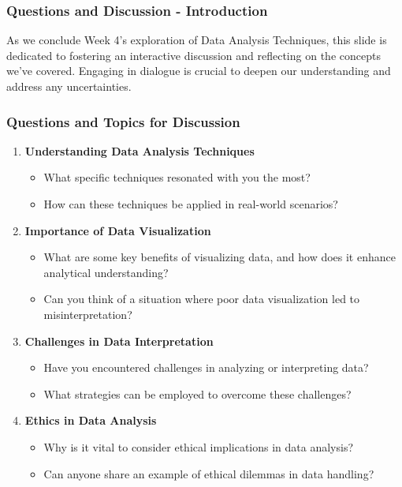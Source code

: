 \documentclass[aspectratio=169]{beamer}
\begin{document}
\begin{frame}[fragile]
  \frametitle{Questions and Discussion - Introduction}
  As we conclude Week 4's exploration of Data Analysis Techniques, this slide is dedicated to fostering an interactive discussion and reflecting on the concepts we've covered. Engaging in dialogue is crucial to deepen our understanding and address any uncertainties.
\end{frame}

\begin{frame}[fragile]
  \frametitle{Questions and Topics for Discussion}
  \begin{enumerate}
    \item \textbf{Understanding Data Analysis Techniques}
      \begin{itemize}
        \item What specific techniques resonated with you the most? 
        \item How can these techniques be applied in real-world scenarios?
      \end{itemize}
      
    \item \textbf{Importance of Data Visualization}
      \begin{itemize}
        \item What are some key benefits of visualizing data, and how does it enhance analytical understanding? 
        \item Can you think of a situation where poor data visualization led to misinterpretation?
      \end{itemize}

    \item \textbf{Challenges in Data Interpretation}
      \begin{itemize}
        \item Have you encountered challenges in analyzing or interpreting data? 
        \item What strategies can be employed to overcome these challenges?
      \end{itemize}

    \item \textbf{Ethics in Data Analysis}
      \begin{itemize}
        \item Why is it vital to consider ethical implications in data analysis?
        \item Can anyone share an example of ethical dilemmas in data handling?
      \end{itemize}
  \end{enumerate}
\end{frame}
\end{document}

